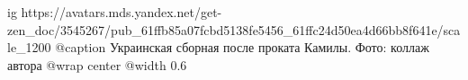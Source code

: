  
 
 
 
 

\ifcmt
  ig https://avatars.mds.yandex.net/get-zen_doc/3545267/pub_61ffb85a07fcbd5138fe5456_61ffc24d50ea4d66bb8f641e/scale_1200
  @caption Украинская сборная после проката Камилы. Фото: коллаж автора
  @wrap center
  @width 0.6
\fi
